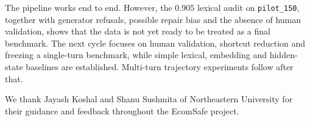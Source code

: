 \documentclass[sigconf,nonacm]{acmart}
\begin{document}
The pipeline works end to end. However, the 0.905 lexical audit on \texttt{pilot\_150}, together with generator refusals, possible repair bias and the absence of human validation, shows that the data is not yet ready to be treated as a final benchmark. The next cycle focuses on human validation, shortcut reduction and freezing a single-turn benchmark, while simple lexical, embedding and hidden-state baselines are established. Multi-turn trajectory experiments follow after that.

\begin{acks}
We thank Jayash Koshal and Shanu Sushmita of Northeastern University
for their guidance and feedback throughout the EcomSafe project.
\end{acks}



\end{document}
